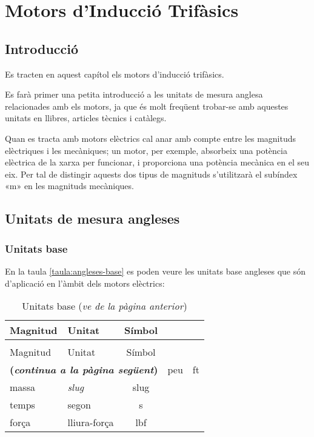 \chapter{Motors d'Inducció Trifàsics}\label{chap:motors-ind}

\section{Introducció}

Es tracten en aquest capítol els motors d'inducció trifàsics.

Es farà primer una petita introducció a les unitats de mesura anglesa relacionades amb els motors, ja que és molt freqüent trobar-se amb aquestes unitats en llibres, articles tècnics i catàlegs.

Quan es tracta amb motors elèctrics cal anar amb compte entre les magnituds elèctriques i les mecàniques; un motor, per exemple, absorbeix una potència elèctrica de la xarxa per funcionar, i proporciona una potència mecànica en el seu eix. Per tal de distingir aquests dos tipus de magnituds s'utilitzarà el subíndex «m» en les magnituds mecàniques.

\section{Unitats de mesura angleses}

\subsection{Unitats base}

En la taula \vref{taula:angleses-base} es poden veure les unitats base angleses que són d'aplicació en l'àmbit dels motors elèctrics:
\begin{longtable}[h]{llc}
   \caption{\label{taula:angleses-base}Unitats angleses base}\\
   \toprule[1pt]
    Magnitud & Unitat & Símbol \\
   \midrule
   \endfirsthead
   \caption[]{Unitats base (\emph{ve de la pàgina anterior})}\\
   \toprule[1pt]
    Magnitud & Unitat & Símbol \\
   \midrule
   \endhead
   \midrule
   \multicolumn{3}{r}{\sffamily\bfseries\color{NavyBlue}(\emph{continua a la pàgina següent})}
   \endfoot
   \endlastfoot
   longitud & peu & ft \\
   massa & \textit{slug} & slug \\
   temps & segon & s\\
   força & lliura-força & lbf \\
   \bottomrule[1pt]
\end{longtable}

